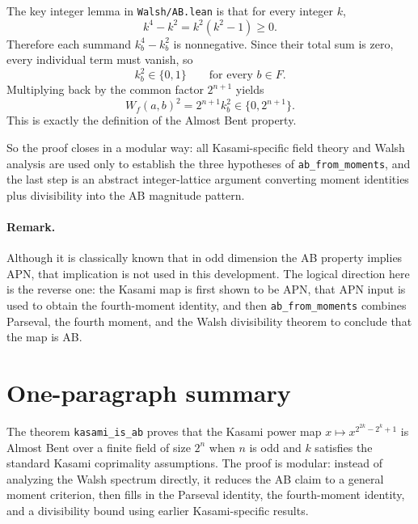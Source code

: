 \documentclass[11pt]{article}
\begin{document}
The key integer lemma in \texttt{Walsh/AB.lean} is that for every integer $k$,
\[
  k^4 - k^2 = k^2(k^2-1) \ge 0.
\]
Therefore each summand $k_b^4-k_b^2$ is nonnegative. Since their total sum is zero, every individual term must vanish, so
\[
  k_b^2 \in \{0,1\}
  \qquad \text{for every } b \in F.
\]
Multiplying back by the common factor $2^{n+1}$ yields
\[
  W_f(a,b)^2 = 2^{n+1} k_b^2 \in \{0, 2^{n+1}\}.
\]
This is exactly the definition of the Almost Bent property.

So the proof closes in a modular way: all Kasami-specific field theory and Walsh analysis are used only to establish the three hypotheses of \texttt{ab\_from\_moments}, and the last step is an abstract integer-lattice argument converting moment identities plus divisibility into the AB magnitude pattern.

\paragraph{Remark.}
Although it is classically known that in odd dimension the AB property implies APN, that implication is not used in this development. The logical direction here is the reverse one: the Kasami map is first shown to be APN, that APN input is used to obtain the fourth-moment identity, and then \texttt{ab\_from\_moments} combines Parseval, the fourth moment, and the Walsh divisibility theorem to conclude that the map is AB.

\section{One-paragraph summary}
The theorem \texttt{kasami\_is\_ab} proves that the Kasami power map $x \mapsto x^{2^{2k} - 2^k + 1}$ is Almost Bent over a finite field of size $2^n$ when $n$ is odd and $k$ satisfies the standard Kasami coprimality assumptions. The proof is modular: instead of analyzing the Walsh spectrum directly, it reduces the AB claim to a general moment criterion, then fills in the Parseval identity, the fourth-moment identity, and a divisibility bound using earlier Kasami-specific results.
\end{document}
